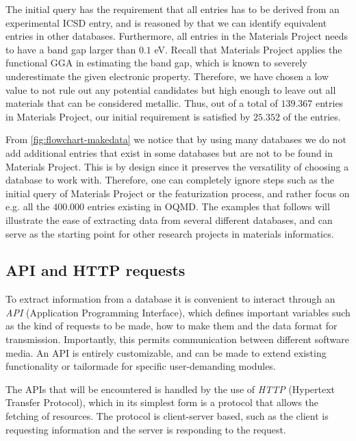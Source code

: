 

\noindent The initial query has the requirement that all entries has to be derived from an experimental ICSD entry, and is reasoned by that we can identify equivalent entries in other databases. Furthermore, all entries in the Materials Project needs to have a band gap larger than $0.1$ eV. Recall that Materials Project applies the functional GGA in estimating the band gap, which is known to severely underestimate the given electronic property. Therefore, we have chosen a low value to not rule out any potential candidates but high enough to leave out all materials that can be considered metallic. Thus, out of a total of $139.367$ entries in Materials Project, our initial requirement is satisfied by $25.352$ of the entries.

From \autoref{fig:flowchart-makedata} we notice that by using many databases we do not add additional entries that exist in some databases but are not to be found in Materials Project. This is by design since it preserves the versatility of choosing a database to work with. Therefore, one can completely ignore steps such as the initial query of Materials Project or the featurization process, and rather focus on e.g. all the $400.000$ entries existing in OQMD. The examples that follows will illustrate the ease of extracting data from several different databases, and can serve as the starting point for other research projects in materials informatics.

\subsection{API and HTTP requests}

To extract information from a database it is convenient to interact through an \textit{API} (Application Programming Interface), which defines important variables such as the kind of requests to be made, how to make them and the data format for transmission. Importantly, this permits communication between different software media. An API is entirely customizable, and can be made to extend existing functionality or tailormade for specific user-demanding modules.

The APIs that will be encountered is handled by the use of \textit{HTTP} (Hypertext Transfer Protocol), which in its simplest form is a protocol that allows the fetching of resources. The protocol is client-server based, such as the client is requesting information and the server is responding to the request.

